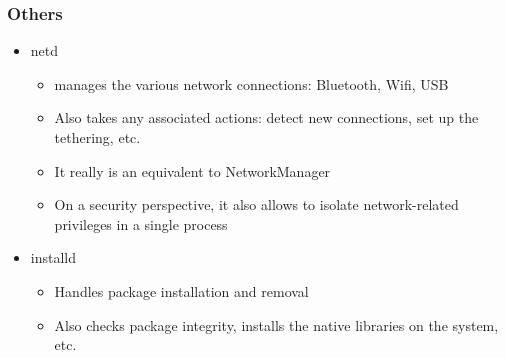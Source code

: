 \begin{frame}
  \frametitle{Others}
  \begin{itemize}
  \item{netd}
    \begin{itemize}
    \item {} manages the various network connections: Bluetooth,
      Wifi, USB
    \item Also takes any associated actions: detect new
      connections, set up the tethering, etc.
    \item It really is an equivalent to NetworkManager
    \item On a security perspective, it also allows to isolate
      network-related privileges in a single process
    \end{itemize}
  \item{installd}
    \begin{itemize}
    \item Handles package installation and removal
    \item Also checks package integrity, installs the
      native libraries on the system, etc.
    \end{itemize}
  \end{itemize}
\end{frame}
